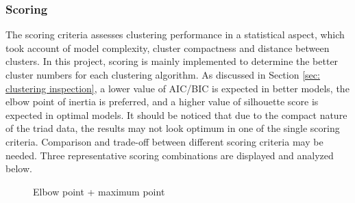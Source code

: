 \documentclass[a4paper]{article}
\begin{document}
\subsubsection{Scoring}
The scoring criteria assesses clustering performance in a statistical aspect, which took account of model complexity, cluster compactness and distance between clusters. In this project, scoring is mainly implemented to determine the better cluster numbers for each clustering algorithm. As discussed in Section \ref{sec: clustering inspection}, a lower value of AIC/BIC is expected in better models, the elbow point of inertia is preferred, and a higher value of silhouette score is expected in optimal models. It should be noticed that due to the compact nature of the triad data, the results may not look optimum in one of the single scoring criteria. Comparison and trade-off between different scoring criteria may be needed. Three representative scoring combinations are displayed and analyzed below.

\begin{figure}[H]
    \centering
    \caption{Elbow point + maximum point}
    \label{fig: PCA_xyz_gmm}
\end{figure}
\end{document}
